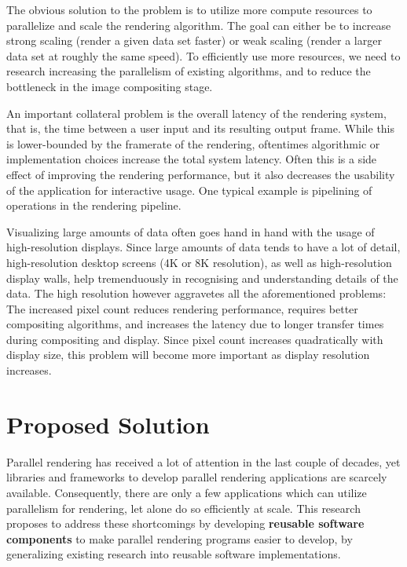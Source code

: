 The obvious solution to the problem is to utilize more compute resources to
parallelize and scale the rendering algorithm. The goal can either be to
increase strong scaling (render a given data set faster) or weak scaling (render
a larger data set at roughly the same speed). To efficiently use more resources,
we need to research increasing the parallelism of existing algorithms, and to
reduce the bottleneck in the image compositing stage.

An important collateral problem is the overall latency of the rendering system,
that is, the time between a user input and its resulting output frame. While
this is lower-bounded by the framerate of the rendering, oftentimes algorithmic
or implementation choices increase the total system latency. Often this is a
side effect of improving the rendering performance, but it also decreases the
usability of the application for interactive usage. One typical example is
pipelining of operations in the rendering pipeline.

Visualizing large amounts of data often goes hand in hand with the usage of
high-resolution displays. Since large amounts of data tends to have a lot of
detail, high-resolution desktop screens (4K or 8K resolution), as well as
high-resolution display walls, help tremenduously in recognising and
understanding details of the data. The high resolution however aggravetes all
the aforementioned problems: The increased pixel count reduces rendering
performance, requires better compositing algorithms, and increases the latency
due to longer transfer times during compositing and display. Since pixel count
increases quadratically with display size, this problem will become more
important as display resolution increases.

\chapter{Proposed Solution} %

Parallel rendering has received a lot of attention in the last couple of
decades, yet libraries and frameworks to develop parallel rendering applications
are scarcely available. Consequently, there are only a few applications which
can utilize parallelism for rendering, let alone do so efficiently at scale.
This research proposes to address these shortcomings by developing {\bf reusable
software components} to make parallel rendering programs easier to develop, by
generalizing existing research into reusable software implementations.

